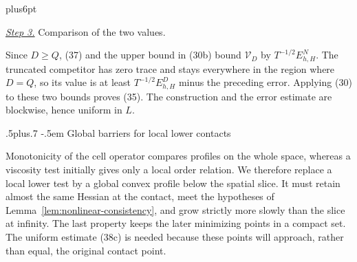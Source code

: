 \documentclass[11pt,reqno]{amsart}
\makeatletter
\def\subsection{\@startsection{subsection}{2}{0pt}%
  {.5\linespacing plus.7\linespacing}
  {-.5em}
  {\normalfont\scshape}}
\theoremstyle{plain}
\theoremstyle{definition}
\theoremstyle{remark}
\renewenvironment{proof}[1][\proofname]{%
  \par
  \pushQED{\qed}%
  \normalfont
  \topsep6pt plus6pt\relax
  \trivlist
  \item[\hskip\labelsep\slshape #1\@addpunct{.}]%
  \ignorespaces
}{%
  \popQED
  \endtrivlist
  \@endpefalse
}
\DeclareRobustCommand{\qed}{%
  \leavevmode\unskip\penalty9999\hbox{}\nobreak
  \ifmmode
    \makebox[0pt][l]{\qquad\hbox{\qedsymbol}}%
  \else
    \qquad\hbox{\qedsymbol}%
  \fi
}
\renewcommand{\qedsymbol}{\rule[.47pt]{4pt}{6pt}}
\numberwithin{equation}{section}
\newcommand{\1}{\mathbf 1}
\makeatother
\begin{document}
\begin{proof}
\smallskip\noindent
\underline{\textit{Step 3.}} Comparison of the two values.

Since $D\geq Q$, (37) and the upper bound in (30b) bound
$\mathcal V_D$ by $T^{-1/2}E_{h,H}^N$.  The truncated competitor has
zero trace and stays everywhere in the region where $D=Q$, so its
value is at least $T^{-1/2}E_{h,H}^D$ minus the preceding error.
Applying (30) to these two bounds proves (35).  The construction and
the error estimate are blockwise, hence uniform in $L$.

\end{proof}

\subsection{Global barriers for local lower contacts}

Monotonicity of the cell operator compares profiles on the whole
space, whereas a viscosity test initially gives only a local order
relation.  We therefore replace a local lower test by a global convex
profile below the spatial slice.  It must retain almost the same
Hessian at the contact, meet the hypotheses of
Lemma~\ref{lem:nonlinear-consistency}, and grow strictly more slowly
than the slice at infinity.  The last property keeps the later
minimizing points in a compact set.  The uniform estimate (38c) is
needed because these points will approach, rather than equal, the
original contact point.
\end{document}
